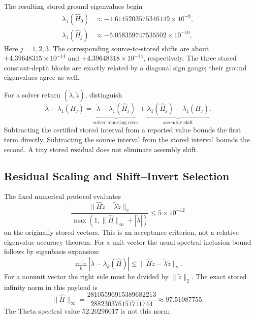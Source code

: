 \documentclass[journal,a4paper,10pt]{IEEEtran}
\theoremstyle{definition}\newtheorem{definition}[theorem]{Definition}
\theoremstyle{remark}\newtheorem{remark}[theorem]{Remark}
\newcommand{\norm}[1]{\lVert #1\rVert}
\begin{document}
The resulting stored ground eigenvalues begin
\begin{align}
\lambda_1(\widehat H_0)&\approx-1.6145203575346149\times10^{-8},\\
\lambda_1(\widehat H_j)&\approx-5.058359747535502\times10^{-10},
\nonumber
\end{align}
Here $j=1,2,3$.
The corresponding source-to-stored shifts are about $+4.39648315\times10^{-14}$ and $+4.39648318\times10^{-14}$, respectively. The three stored constant-depth blocks are exactly related by a diagonal sign gauge; their ground eigenvalues agree as well.

For a solver return $(\widetilde\lambda,\widetilde z)$, distinguish
\begin{equation}
\widetilde\lambda-\lambda_1(H_j)=
\underbrace{\widetilde\lambda-\lambda_1(\widehat H_j)}_{\text{solver reporting error}}
+\underbrace{\lambda_1(\widehat H_j)-\lambda_1(H_j)}_{\text{assembly shift}}.
\end{equation}
Subtracting the certified stored interval from a reported value bounds the first term directly. Subtracting the source interval from the stored interval bounds the second. A tiny stored residual does not eliminate assembly shift.

\subsection{Residual Scaling and Shift--Invert Selection}
The fixed numerical protocol evaluates
\begin{equation}\label{eq:residual}
\frac{\norm{\widehat H\widetilde z-\widetilde\lambda\widetilde z}_2}
{\max(1,\norm{\widehat H}_\infty+|\widetilde\lambda|)}
\leq5\times10^{-12}
\end{equation}
on the originally stored vectors. This is an acceptance criterion, not a relative eigenvalue accuracy theorem. For a unit vector the usual spectral inclusion bound follows by eigenbasis expansion:
\begin{equation}
\min_k|\widetilde\lambda-\lambda_k(\widehat H)|
\leq\norm{\widehat H\widetilde z-\widetilde\lambda\widetilde z}_2.
\end{equation}
For a nonunit vector the right side must be divided by $\norm{\widetilde z}_2$. The exact stored infinity norm in this payload is
\begin{equation}
\norm{\widehat H}_\infty=
\frac{28105596915389682213}{288230376151711744}
\approx97.51087755.
\end{equation}
The Theta spectral value $52.20296017$ is not this norm.
\end{document}
